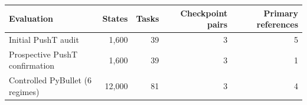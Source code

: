 \begin{tabular}{lrrrr}
\toprule
Evaluation & States & Tasks & Checkpoint pairs & Primary references \\
\midrule
Initial PushT audit & 1,600 & 39 & 3 & 5 \\
Prospective PushT confirmation & 1,600 & 39 & 3 & 1 \\
Controlled PyBullet (6 regimes) & 12,000 & 81 & 3 & 4 \\
\bottomrule
\end{tabular}
